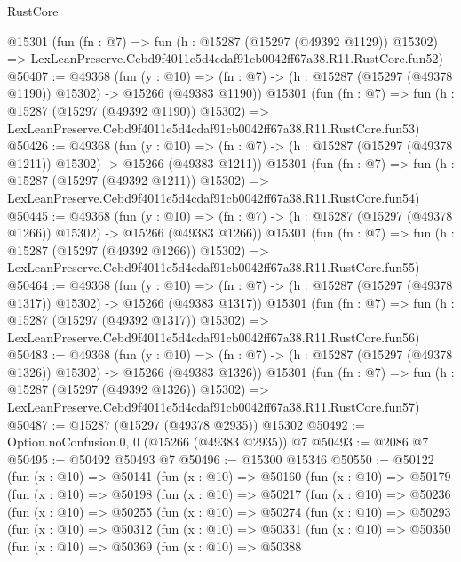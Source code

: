 \begin{lexlean}{RustCore}
\begin{coremodule}
    @15301
    (fun (fn : @7) =>
    fun (h : @15287 (@15297 (@49392 @1129)) @15302) =>
    LexLeanPreserve.Cebd9f4011e5d4cdaf91cb0042ff67a38.R11.RustCore.fun52)
@50407 := @49368
    (fun (y : @10) =>
    (fn : @7) -> (h : @15287 (@15297 (@49378 @1190)) @15302) -> @15266 (@49383 @1190))
    @15301
    (fun (fn : @7) =>
    fun (h : @15287 (@15297 (@49392 @1190)) @15302) =>
    LexLeanPreserve.Cebd9f4011e5d4cdaf91cb0042ff67a38.R11.RustCore.fun53)
@50426 := @49368
    (fun (y : @10) =>
    (fn : @7) -> (h : @15287 (@15297 (@49378 @1211)) @15302) -> @15266 (@49383 @1211))
    @15301
    (fun (fn : @7) =>
    fun (h : @15287 (@15297 (@49392 @1211)) @15302) =>
    LexLeanPreserve.Cebd9f4011e5d4cdaf91cb0042ff67a38.R11.RustCore.fun54)
@50445 := @49368
    (fun (y : @10) =>
    (fn : @7) -> (h : @15287 (@15297 (@49378 @1266)) @15302) -> @15266 (@49383 @1266))
    @15301
    (fun (fn : @7) =>
    fun (h : @15287 (@15297 (@49392 @1266)) @15302) =>
    LexLeanPreserve.Cebd9f4011e5d4cdaf91cb0042ff67a38.R11.RustCore.fun55)
@50464 := @49368
    (fun (y : @10) =>
    (fn : @7) -> (h : @15287 (@15297 (@49378 @1317)) @15302) -> @15266 (@49383 @1317))
    @15301
    (fun (fn : @7) =>
    fun (h : @15287 (@15297 (@49392 @1317)) @15302) =>
    LexLeanPreserve.Cebd9f4011e5d4cdaf91cb0042ff67a38.R11.RustCore.fun56)
@50483 := @49368
    (fun (y : @10) =>
    (fn : @7) -> (h : @15287 (@15297 (@49378 @1326)) @15302) -> @15266 (@49383 @1326))
    @15301
    (fun (fn : @7) =>
    fun (h : @15287 (@15297 (@49392 @1326)) @15302) =>
    LexLeanPreserve.Cebd9f4011e5d4cdaf91cb0042ff67a38.R11.RustCore.fun57)
@50487 := @15287 (@15297 (@49378 @2935)) @15302
@50492 := Option.noConfusion.{0, 0} (@15266 (@49383 @2935)) @7
@50493 := @2086 @7
@50495 := @50492 @50493 @7
@50496 := @15300 @15346
@50550 := @50122
    (fun (x : @10) =>
    @50141
      (fun (x : @10) =>
      @50160
        (fun (x : @10) =>
        @50179
          (fun (x : @10) =>
          @50198
            (fun (x : @10) =>
            @50217
              (fun (x : @10) =>
              @50236
                (fun (x : @10) =>
                @50255
                  (fun (x : @10) =>
                  @50274
                    (fun (x : @10) =>
                    @50293
                      (fun (x : @10) =>
                      @50312
                        (fun (x : @10) =>
                        @50331
                          (fun (x : @10) =>
                          @50350
                            (fun (x : @10) =>
                            @50369
                              (fun (x : @10) =>
                              @50388

\end{coremodule}
\end{lexlean}
